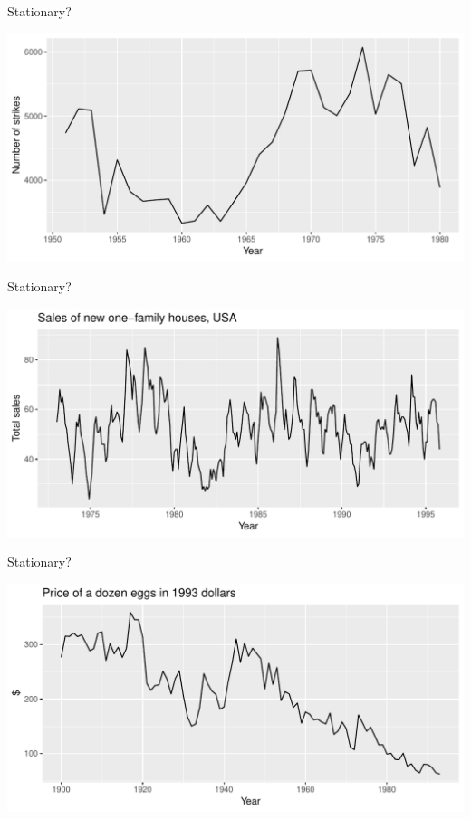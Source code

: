 \documentclass[14pt,ignorenonframetext,]{beamer}
\begin{document}
\begin{frame}{Stationary?}

\includegraphics{week_5_arima_files/figure-beamer/unnamed-chunk-3-1.pdf}

\end{frame}

\begin{frame}{Stationary?}

\includegraphics{week_5_arima_files/figure-beamer/unnamed-chunk-4-1.pdf}

\end{frame}

\begin{frame}{Stationary?}

\includegraphics{week_5_arima_files/figure-beamer/unnamed-chunk-5-1.pdf}

\end{frame}
\end{document}

